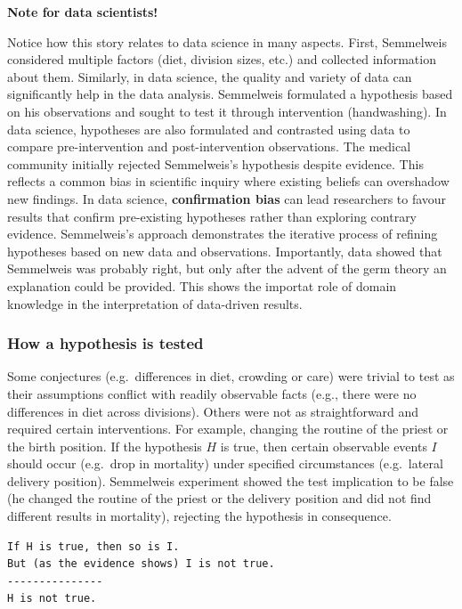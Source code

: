 \documentclass[
  12pt,
]{book}
\begin{document}
\begin{tipbox}

\textbf{Note for data scientists!}

Notice how this story relates to data science in many aspects. First, Semmelweis considered multiple factors (diet, division sizes, etc.) and collected information about them. Similarly, in data science, the quality and variety of data can significantly help in the data analysis. Semmelweis formulated a hypothesis based on his observations and sought to test it through intervention (handwashing). In data science, hypotheses are also formulated and contrasted using data to compare pre-intervention and post-intervention observations. The medical community initially rejected Semmelweis's hypothesis despite evidence. This reflects a common bias in scientific inquiry where existing beliefs can overshadow new findings. In data science, \textbf{confirmation bias} can lead researchers to favour results that confirm pre-existing hypotheses rather than exploring contrary evidence. Semmelweis's approach demonstrates the iterative process of refining hypotheses based on new data and observations. Importantly, data showed that Semmelweis was probably right, but only after the advent of the germ theory an explanation could be provided. This shows the importat role of domain knowledge in the interpretation of data-driven results.

\end{tipbox}

\subsubsection{How a hypothesis is tested}\label{how-a-hypothesis-is-tested}

Some conjectures (e.g.~differences in diet, crowding or care) were trivial to test as their assumptions conflict with readily observable facts (e.g., there were no differences in diet across divisions). Others were not as straightforward and required certain interventions. For example, changing the routine of the priest or the birth position. If the hypothesis \(H\) is true, then certain observable events \(I\) should occur (e.g.~drop in mortality) under specified circumstances (e.g.~lateral delivery position). Semmelweis experiment showed the test implication to be false (he changed the routine of the priest or the delivery position and did not find different results in mortality), rejecting the hypothesis in consequence.

\begin{verbatim}
If H is true, then so is I.
But (as the evidence shows) I is not true.
---------------
H is not true.
\end{verbatim}
\end{document}
